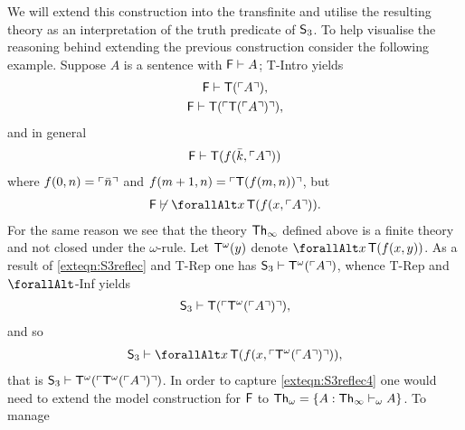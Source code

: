 \documentclass[UKenglish,cleveref,DIV=12]{scrartcl}
\let\forall\forallAlt
\theoremstyle{definition}
\theoremstyle{definition}
\begin{document}
We will extend this construction into the transfinite and utilise the resulting
theory as an interpretation of the truth predicate of $\mathsf{S}_3$. To help
visualise the reasoning behind extending the previous construction consider the
following example.
%
Suppose $A$ is a sentence with $\mathsf{F}\vdash A$; T-Intro yields
\begin{gather*}
 \mathsf{F}\vdash \mathsf{T}(\ulcorner{A}\urcorner),\\
 \mathsf{F}\vdash \mathsf{T}(\ulcorner{\mathsf{T}(\ulcorner{A}\urcorner)}\urcorner),
\end{gather*}
and in general
\begin{align}\label{exteqn:S3reflec2}
 \mathsf{F}\vdash \mathsf{T}(f(\bar k,\ulcorner{A}\urcorner))
\end{align}
where $f(0,n)=\ulcorner{\bar n}\urcorner$ and $f(m+1,n)=\ulcorner{\mathsf{T}({f(m,n)})}\urcorner$, but
\begin{align}\label{exteqn:S3reflec3}
  \F\not\proves\forall x\,\T(f(x,\gn A)).
\end{align}
For the same reason we see that the theory $\mathsf{Th}_\infty$ defined above is a finite theory and not closed under the $\omega$-rule. Let
$\mathsf{T}^\omega(y)$ denote $\forall x\,\T(f(x,y))$. As a result of
\cref{exteqn:S3reflec} and T-Rep one has $\mathsf{S}_3\vdash \mathsf{T}^\omega(\ulcorner{A}\urcorner)$, whence T-Rep and $\forall$-Inf yields
\begin{gather}\label{exteqn:S3reflec4}
 \mathsf{S}_3\vdash \mathsf{T}(\ulcorner{\mathsf{T}^\omega(\ulcorner{A}\urcorner)}\urcorner),
\end{gather}
and so
\begin{gather}\label{exteqn:S3reflec5}
 \theory S_3\proves \forall x\,\T(f(x,\gn{\T^\omega(\gn A)})),
\end{gather}
that is $\mathsf{S}_3\vdash \mathsf{T}^\omega(\ulcorner{\mathsf{T}^\omega(\ulcorner{A}\urcorner)}\urcorner)$. In order to capture
\cref{exteqn:S3reflec4} one would need to extend the model construction for
$\mathsf{F}$ to $\mathsf{Th}_\omega=\{A:\mathsf{Th}_\infty\vdash_\omega A\}$. To manage
\end{document}
